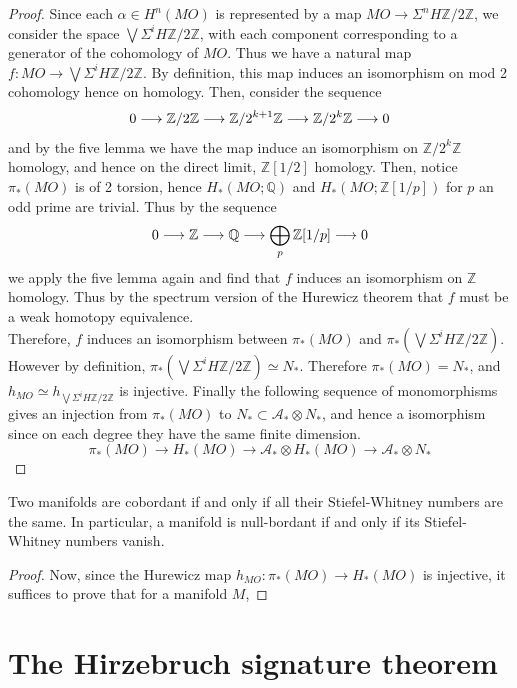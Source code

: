 	\begin{proof}
		Since each $\alpha\in H^n(MO)$ is represented by a map $MO\to\Sigma^nH\mathbb{Z}/2\mathbb{Z}$, we consider the space $\bigvee\Sigma^iH\mathbb{Z}/2\mathbb{Z}$, with each component corresponding to a generator of the cohomology of $MO$. Thus we have a natural map $f:MO\to\bigvee\Sigma^iH\mathbb{Z}/2\mathbb{Z}$. By definition, this map induces an isomorphism on mod 2 cohomology hence on homology. Then, consider the sequence
		\[ 0\longrightarrow\mathbb{Z}/2\mathbb{Z}\longrightarrow\mathbb{Z}/2^{k+1}\mathbb{Z}\longrightarrow\mathbb{Z}/2^k\mathbb{Z}\longrightarrow 0 \]
		and by the five lemma we have the map induce an isomorphism on $\mathbb{Z}/2^k\mathbb{Z}$ homology, and hence on the direct limit, $\mathbb{Z}[1/2]$ homology. Then, notice $\pi_*(MO)$ is of 2 torsion, hence $H_*(MO;\mathbb{Q})$ and $H_*(MO;\mathbb{Z}[1/p])$ for $p$ an odd prime are trivial. Thus by the sequence
		\[ 0\longrightarrow\mathbb{Z}\longrightarrow\mathbb{Q}\longrightarrow\bigoplus_p\mathbb{Z}[1/p]\longrightarrow0 \]
		we apply the five lemma again and find that $f$ induces an isomorphism on $\mathbb{Z}$ homology. Thus by the spectrum version of the Hurewicz theorem that $f$ must be a weak homotopy equivalence. \\
		Therefore, $f$ induces an isomorphism between $\pi_*(MO)$ and $\pi_*(\bigvee\Sigma^iH\mathbb{Z}/2\mathbb{Z})$. However by definition, $\pi_*(\bigvee\Sigma^iH\mathbb{Z}/2\mathbb{Z})\simeq N_*$. Therefore $\pi_*(MO)=N_*$, and $h_{MO}\simeq h_{\bigvee\Sigma^iH\mathbb{Z}/2\mathbb{Z}}$ is injective. Finally the following sequence of monomorphisms gives an injection from $\pi_*(MO)$ to $N_*\subset\mathcal{A}_*\otimes N_*$, and hence a isomorphism since on each degree they have the same finite dimension. 
		\[ \pi_*(MO)\to H_*(MO)\to\mathcal{A}_*\otimes H_*(MO)\to\mathcal{A}_*\otimes N_* \]
	\end{proof}

	\begin{thm}\label{cobordism_SW_num}
		Two manifolds are cobordant if and only if all their Stiefel-Whitney numbers are the same. In particular, a manifold is null-bordant if and only if its Stiefel-Whitney numbers vanish. 
	\end{thm}
	\begin{proof}
		Now, since the Hurewicz map $h_{MO}:\pi_*(MO)\to H_*(MO)$ is injective, it suffices to prove that for a manifold $M$, 
	\end{proof}




\section{The Hirzebruch signature theorem}

